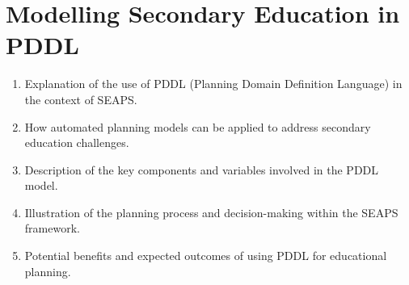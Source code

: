 \section{Modelling Secondary Education in PDDL}
\begin{enumerate}
    \item Explanation of the use of PDDL (Planning Domain Definition Language) in the context of SEAPS\@.
    \item How automated planning models can be applied to address secondary education challenges.
    \item Description of the key components and variables involved in the PDDL model.
    \item Illustration of the planning process and decision-making within the SEAPS framework.
    \item Potential benefits and expected outcomes of using PDDL for educational planning.
\end{enumerate}
